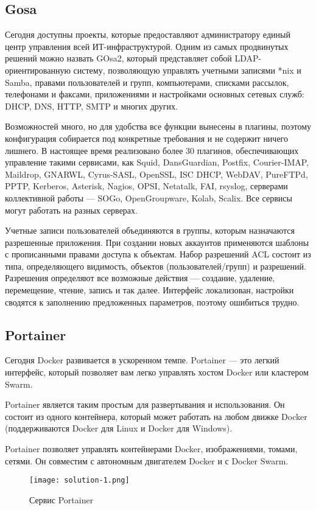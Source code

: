 \subsection{Gosa}
Сегодня доступны проекты, которые предоставляют администратору единый центр управления всей ИТ-инфраструктурой. Одним из самых продвинутых решений можно назвать GOsa2, который представляет собой LDAP-ориентированную систему, позволяющую управлять учетными записями *nix и Samba, правами пользователей и групп, компьютерами, списками рассылок, телефонами и факсами, приложениями и настройками основных сетевых служб: DHCP, DNS, HTTP, SMTP и многих других.

Возможностей много, но для удобства все функции вынесены в плагины, поэтому конфигурация собирается под конкретные требования и не содержит ничего лишнего. В настоящее время реализовано более 30 плагинов, обеспечивающих управление такими сервисами, как Squid, DansGuardian, Postfix, Courier-IMAP, Maildrop, GNARWL, Cyrus-SASL, OpenSSL, ISC DHCP, WebDAV, PureFTPd, PPTP, Kerberos, Asterisk, Nagios, OPSI, Netatalk, FAI, rsyslog, серверами коллективной работы — SOGo, OpenGroupware, Kolab, Scalix. Все сервисы могут работать на разных серверах.

Учетные записи пользователей объединяются в группы, которым назначаются разрешенные приложения. При создании новых аккаунтов применяются шаблоны с прописанными правами доступа к объектам. Набор разрешений ACL состоит из типа, определяющего видимость, объектов (пользователей/групп) и разрешений. Разрешения определяют все возможные действия — создание, удаление, перемещение, чтение, запись и так далее. Интерфейс локализован, настройки сводятся к заполнению предложенных параметров, поэтому ошибиться трудно.

\subsection{Portainer}

Сегодня Docker развивается в ускоренном темпе. Portainer — это легкий интерфейс, который позволяет вам легко управлять хостом Docker или кластером Swarm.

Portainer является таким простым для развертывания и использования. Он состоит из одного контейнера, который может работать на любом движке Docker (поддерживаются Docker для Linux и Docker для Windows).

Portainer позволяет управлять контейнерами Docker, изображениями, томами, сетями. Он совместим с автономным двигателем Docker и с Docker Swarm.


\begin{figure}[h!]
\centering
	\texttt{[image: solution-1.png]}
	\caption{Сервис Portainer}
\end{figure}
\clearpage